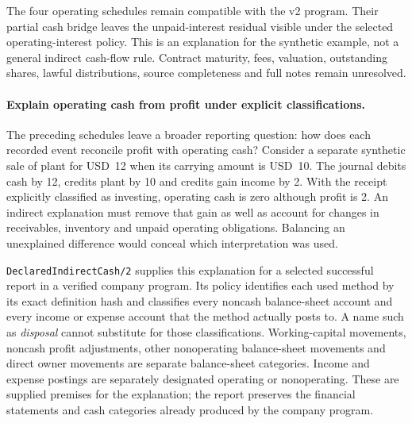 The four operating schedules remain compatible with the v2 program. Their partial cash bridge leaves the unpaid-interest residual visible under the selected operating-interest policy. This is an explanation for the synthetic example, not a general indirect cash-flow rule. Contract maturity, fees, valuation, outstanding shares, lawful distributions, source completeness and full notes remain unresolved.

\paragraph{Explain operating cash from profit under explicit classifications.}
The preceding schedules leave a broader reporting question: how does each
recorded event reconcile profit with operating cash? Consider a separate
synthetic sale of plant for USD~12 when its carrying amount is USD~10. The
journal debits cash by 12, credits plant by 10 and credits gain income by 2.
With the receipt explicitly classified as investing, operating cash is zero
although profit is 2. An indirect explanation must remove that gain as well as
account for changes in receivables, inventory and unpaid operating obligations.
Balancing an unexplained difference would conceal which interpretation was used.

\texttt{DeclaredIndirectCash/2} supplies this explanation for a selected successful
report in a verified company program. Its policy identifies each used method
by its exact definition hash and classifies every noncash balance-sheet account
and every income or expense account that the method actually posts to. A name
such as \emph{disposal} cannot substitute for those classifications. Working-capital
movements, noncash profit adjustments, other nonoperating balance-sheet movements
and direct owner movements are separate balance-sheet categories. Income and
expense postings are separately designated operating or nonoperating. These are
supplied premises for the explanation; the report preserves the financial
statements and cash categories already produced by the company program.

